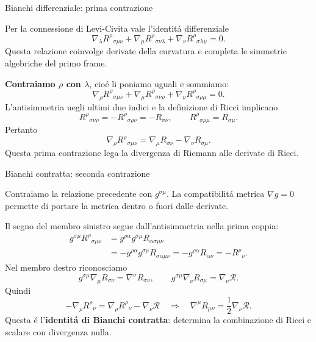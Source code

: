 \begin{frame}[t]{Bianchi differenziale: prima contrazione}
\small\raggedright
Per la connessione di Levi-Civita vale l'identit\'a differenziale
\[
\boxed{
\nabla_\lambda R^\rho{}_{\sigma\mu\nu}
+\nabla_\mu R^\rho{}_{\sigma\nu\lambda}
+\nabla_\nu R^\rho{}_{\sigma\lambda\mu}=0.
}
\]
Questa relazione coinvolge derivate della curvatura e completa
le simmetrie algebriche del primo frame.

\medskip
\textbf{Contraiamo $\rho$ con $\lambda$}, cio\'e li poniamo uguali
e sommiamo:
\[
\nabla_\rho R^\rho{}_{\sigma\mu\nu}
+\nabla_\mu R^\rho{}_{\sigma\nu\rho}
+\nabla_\nu R^\rho{}_{\sigma\rho\mu}=0.
\]
L'antisimmetria negli ultimi due indici e la definizione di Ricci implicano
\[
R^\rho{}_{\sigma\nu\rho}
=-R^\rho{}_{\sigma\rho\nu}=-R_{\sigma\nu},
\qquad
R^\rho{}_{\sigma\rho\mu}=R_{\sigma\mu}.
\]
Pertanto
\[
\boxed{
\nabla_\rho R^\rho{}_{\sigma\mu\nu}
=\nabla_\mu R_{\sigma\nu}-\nabla_\nu R_{\sigma\mu}.
}
\]
Questa prima contrazione lega la divergenza di Riemann
alle derivate di Ricci.
\end{frame}

\begin{frame}[t]{Bianchi contratta: seconda contrazione}
\small\raggedright
Contraiamo la relazione precedente con $g^{\sigma\mu}$.
La compatibilit\'a metrica $\nabla g=0$ permette di portare
la metrica dentro o fuori dalle derivate.

\medskip
Il segno del membro sinistro segue dall'antisimmetria nella prima coppia:
\[
\begin{aligned}
g^{\sigma\mu}R^\rho{}_{\sigma\mu\nu}
&=g^{\rho\alpha}g^{\sigma\mu}R_{\alpha\sigma\mu\nu}\\
&=-g^{\rho\alpha}g^{\sigma\mu}R_{\sigma\alpha\mu\nu}
=-g^{\rho\alpha}R_{\alpha\nu}
=-R^\rho{}_{\nu}.
\end{aligned}
\]
Nel membro destro riconosciamo
\[
g^{\sigma\mu}\nabla_\mu R_{\sigma\nu}
=\nabla^\sigma R_{\sigma\nu},
\qquad
g^{\sigma\mu}\nabla_\nu R_{\sigma\mu}
=\nabla_\nu\mathcal R.
\]
Quindi
\[
-\nabla_\rho R^\rho{}_{\nu}
=\nabla_\rho R^\rho{}_{\nu}-\nabla_\nu\mathcal R
\quad\Longrightarrow\quad
\boxed{\nabla^\mu R_{\mu\nu}=\frac12\nabla_\nu\mathcal R.}
\]
Questa \'e l'\textbf{identit\'a di Bianchi contratta}:
determina la combinazione di Ricci e scalare con divergenza nulla.
\end{frame}

